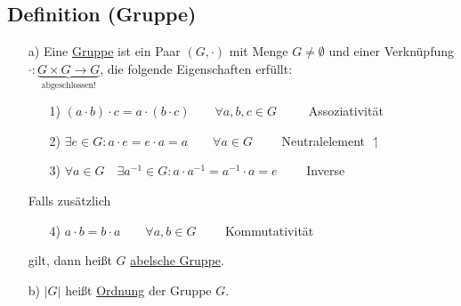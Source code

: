 \documentclass[a4paper, 12pt,titlepage, pdf, headsepline]{scrartcl}
\newcommand{\uline}[1]{\underline{#1}}
\renewcommand{\>}{\rightarrow}
\renewcommand{\*}{\cdot}
\begin{document}
\subsection{Definition (Gruppe)}
\label{3.9}
\begin{itemize}
	\item[a)] Eine \uline{Gruppe} ist ein Paar $(G, \cdot) $ mit Menge $G \neq \emptyset$ und einer Verknüpfung $\cdot : \underbrace{G \times G \rightarrow G}_{\text{abgeschlossen!}}$, die folgende Eigenschaften erfüllt:
	      \begin{itemize}
	      	\item[1)] $(a \cdot b) \cdot c = a \cdot (b \cdot c) \qquad \forall a,b,c \in G\qquad~$ Assoziativität
	      	\item[2)] $\exists e \in G: a \cdot e = e \cdot a = a \qquad \forall a \in G\qquad$ Neutralelement $\upharpoonleft$
	      	\item[3)] $\forall a \in G\quad \exists a^{-1} \in G: a \cdot a^{-1} = a^{-1}\*a = e\qquad$ Inverse
	      \end{itemize}
	      Falls zusätzlich 
	      \begin{itemize}
	      	\item[4)] $a \cdot b = b \cdot a \qquad  \forall a,b \in G\qquad$ Kommutativität \end{itemize}
	      	      gilt, dann heißt $G$ \uline{abelsche Gruppe}.
	      	      		
	      	\item[b)] $| G |$ heißt \uline{Ordnung} der Gruppe $G$.
	      \end{itemize}
\end{document}

